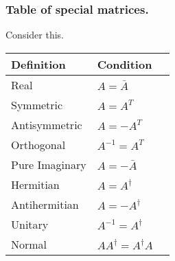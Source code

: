 \documentclass[../main.tex]{subfiles}
\begin{document}
\subsubsection*{Table of special matrices.} Consider this.

\begin{table}[h]
	\centering
	\begin{tabular}{@{}llr@{}}
		\toprule
		Definition     & Condition                   \\
		\midrule
		Real           & $A=\bar{A}$                 \\
		Symmetric      & $A=A^T$                     \\
		Antisymmetric  & $A=-A^T$                    \\
		Orthogonal     & $A^{-1}=A^T$                \\
		Pure Imaginary & $A=-\bar{A}$                \\
		Hermitian      & $A=A^{\dagger}$             \\
		Antihermitian  & $A=-A^{\dagger}$            \\
		Unitary        & $A^{-1}=A^{\dagger}$        \\
		Normal         & $AA^{\dagger}=A^{\dagger}A$ \\
		\bottomrule
	\end{tabular}
\end{table}
\end{document}
